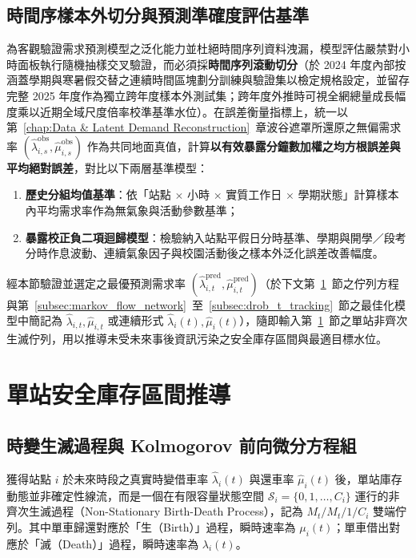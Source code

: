 \subsection{時間序樣本外切分與預測準確度評估基準}\label{subsec:forecast_validation}

為客觀驗證需求預測模型之泛化能力並杜絕時間序列資料洩漏，模型評估嚴禁對小時面板執行隨機抽樣交叉驗證，而必須採\textbf{時間序列滾動切分}（於 2024 年度內部按涵蓋學期與寒暑假交替之連續時間區塊劃分訓練與驗證集以檢定規格設定，並留存完整 2025 年度作為獨立跨年度樣本外測試集；跨年度外推時可視全網總量成長幅度乘以近期全域尺度倍率校準基準水位）。在誤差衡量指標上，統一以第~\ref{chap:Data & Latent Demand Reconstruction}~章波谷遮罩所還原之無偏需求率 $\left(\hat{\lambda}^{\text{obs}}_{i,s}, \hat{\mu}^{\text{obs}}_{i,s}\right)$ 作為共同地面真值，計算\textbf{以有效暴露分鐘數加權之均方根誤差與平均絕對誤差}，對比以下兩層基準模型：
\begin{enumerate}
    \item \textbf{歷史分組均值基準}：依「站點 $\times$ 小時 $\times$ 實質工作日 $\times$ 學期狀態」計算樣本內平均需求率作為無氣象與活動參數基準；
    \item \textbf{暴露校正負二項迴歸模型}：檢驗納入站點平假日分時基準、學期與開學／段考分時作息波動、連續氣象因子與校園活動後之樣本外泛化誤差改善幅度。
\end{enumerate}
經本節驗證並選定之最優預測需求率 $\left(\hat{\lambda}^{\text{pred}}_{i,t}, \hat{\mu}^{\text{pred}}_{i,t}\right)$（於下文第~\ref{sec:birth_death_queue}~節之佇列方程與第~\ref{subsec:markov_flow_network}~至~\ref{subsec:drob_t_tracking}~節之最佳化模型中簡記為 $\hat{\lambda}_{i,t}, \hat{\mu}_{i,t}$ 或連續形式 $\hat{\lambda}_i(t), \hat{\mu}_i(t)$），隨即輸入第~\ref{sec:birth_death_queue}~節之單站非齊次生滅佇列，用以推導未受未來事後資訊污染之安全庫存區間與最適目標水位。

\section{單站安全庫存區間推導}\label{sec:birth_death_queue}

\subsection{時變生滅過程與 Kolmogorov 前向微分方程組}

獲得站點 $i$ 於未來時段之真實時變借車率 $\hat{\lambda}_i(t)$ 與還車率 $\hat{\mu}_i(t)$ 後，單站庫存動態並非確定性線流，而是一個在有限容量狀態空間 $\mathcal{S}_i = \{0, 1, \dots, C_i\}$ 運行的非齊次生滅過程（Non-Stationary Birth-Death Process），記為 $M_t/M_t/1/C_i$ 雙端佇列。其中單車歸還對應於「生（Birth）」過程，瞬時速率為 $\mu_i(t)$；單車借出對應於「滅（Death）」過程，瞬時速率為 $\lambda_i(t)$。

